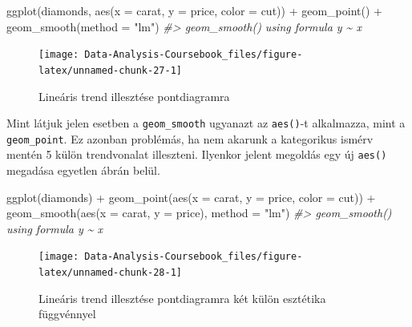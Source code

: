 \documentclass[
]{article}
\newenvironment{Shaded}{\begin{snugshade}}{\end{snugshade}}
\newcommand{\AttributeTok}[1]{\textcolor[rgb]{0.77,0.63,0.00}{#1}}
\newcommand{\CommentTok}[1]{\textcolor[rgb]{0.56,0.35,0.01}{\textit{#1}}}
\newcommand{\FunctionTok}[1]{\textcolor[rgb]{0.00,0.00,0.00}{#1}}
\newcommand{\NormalTok}[1]{#1}
\newcommand{\SpecialCharTok}[1]{\textcolor[rgb]{0.00,0.00,0.00}{#1}}
\newcommand{\StringTok}[1]{\textcolor[rgb]{0.31,0.60,0.02}{#1}}
\begin{document}
\begin{Shaded}
\begin{Highlighting}[]
\FunctionTok{ggplot}\NormalTok{(diamonds, }\FunctionTok{aes}\NormalTok{(}\AttributeTok{x =}\NormalTok{ carat, }\AttributeTok{y =}\NormalTok{ price, }\AttributeTok{color =}\NormalTok{ cut)) }\SpecialCharTok{+}
  \FunctionTok{geom\_point}\NormalTok{() }\SpecialCharTok{+} 
  \FunctionTok{geom\_smooth}\NormalTok{(}\AttributeTok{method =} \StringTok{"lm"}\NormalTok{)}
\CommentTok{\#\textgreater{} \textasciigrave{}geom\_smooth()\textasciigrave{} using formula \textquotesingle{}y \textasciitilde{} x\textquotesingle{}}
\end{Highlighting}
\end{Shaded}

\begin{figure}

{\centering \texttt{[image: Data-Analysis-Coursebook\_files/figure-latex/unnamed-chunk-27-1]} 

}

\caption{Lineáris trend illesztése pontdiagramra}\label{fig:unnamed-chunk-27}
\end{figure}

Mint látjuk jelen esetben a \texttt{geom\_smooth} ugyanazt az \texttt{aes()}-t alkalmazza, mint a \texttt{geom\_point}. Ez azonban problémás, ha nem akarunk a kategorikus ismérv mentén 5 külön trendvonalat illeszteni. Ilyenkor jelent megoldás egy új \texttt{aes()} megadása egyetlen ábrán belül.

\begin{Shaded}
\begin{Highlighting}[]
\FunctionTok{ggplot}\NormalTok{(diamonds) }\SpecialCharTok{+}
  \FunctionTok{geom\_point}\NormalTok{(}\FunctionTok{aes}\NormalTok{(}\AttributeTok{x =}\NormalTok{ carat, }\AttributeTok{y =}\NormalTok{ price, }\AttributeTok{color =}\NormalTok{ cut)) }\SpecialCharTok{+} 
  \FunctionTok{geom\_smooth}\NormalTok{(}\FunctionTok{aes}\NormalTok{(}\AttributeTok{x =}\NormalTok{ carat, }\AttributeTok{y =}\NormalTok{ price), }\AttributeTok{method =} \StringTok{"lm"}\NormalTok{)}
\CommentTok{\#\textgreater{} \textasciigrave{}geom\_smooth()\textasciigrave{} using formula \textquotesingle{}y \textasciitilde{} x\textquotesingle{}}
\end{Highlighting}
\end{Shaded}

\begin{figure}

{\centering \texttt{[image: Data-Analysis-Coursebook\_files/figure-latex/unnamed-chunk-28-1]} 

}

\caption{Lineáris trend illesztése pontdiagramra két külön esztétika függvénnyel}\label{fig:unnamed-chunk-28}
\end{figure}
\end{document}
